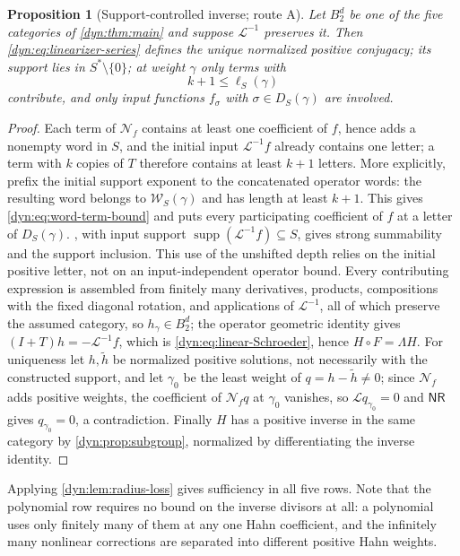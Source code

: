\documentclass[11pt,letterpaper]{article}
\newtheorem{proposition}[proposition]{Proposition}
\theoremstyle{definition}
\theoremstyle{remark}
\newcommand{\supp}{\operatorname{supp}}
\newcommand{\word}{\mathcal W}
\newcommand{\Li}{\mathcal L}
\newcommand{\NN}{\mathcal N}
\newcommand{\nres}{\mathsf{NR}}
\numberwithin{equation}{section}
\begin{document}
\begin{proposition}[Support-controlled inverse; route A]
\label{dyn:prop:linearization}
Let $B_2^{d}$ be one of the five categories of \cref{dyn:thm:main} and
suppose $\Li^{-1}$ preserves it. Then \eqref{dyn:eq:linearizer-series}
defines the unique normalized positive conjugacy; its support lies in
$S^{*}\setminus\{0\}$; at weight $\gamma$ only terms with
\begin{equation}\label{dyn:eq:word-term-bound}
 k+1\le\ell_S(\gamma)
\end{equation}
contribute, and only input functions $f_\sigma$ with $\sigma\in D_S(\gamma)$
are involved.
\end{proposition}
\begin{proof}
Each term of $\NN_f$ contains at least one coefficient of $f$, hence adds a
nonempty word in $S$, and the initial input $\Li^{-1}f$ already contains one
letter; a term with $k$ copies of $T$ therefore contains at least $k+1$
letters. More explicitly, prefix the initial support exponent to the
concatenated operator words: the resulting word belongs to
$\word_S(\gamma)$ and has length at least $k+1$. This gives
\eqref{dyn:eq:word-term-bound} and puts every participating coefficient of
$f$ at a letter of $D_S(\gamma)$. , with input
support $\supp(\Li^{-1}f)\subseteq S$, gives strong summability and the
support inclusion. This use of the unshifted depth relies on the initial
positive letter, not on an input-independent operator bound. Every
contributing expression is assembled from finitely many derivatives,
products, compositions with the fixed diagonal rotation, and applications
of $\Li^{-1}$, all of which preserve the assumed category, so $h_\gamma\in
B_2^{d}$; the operator geometric identity gives $(I+T)h=-\Li^{-1}f$, which
is \eqref{dyn:eq:linear-Schroeder}, hence $H\circ F=\Lambda H$. For
uniqueness let $h,\widetilde h$ be normalized positive solutions, not
necessarily with the constructed support, and let $\gamma_0$ be the least
weight of $q=h-\widetilde h\ne0$; since $\NN_f$ adds positive weights, the
coefficient of $\NN_fq$ at $\gamma_0$ vanishes, so $\Li q_{\gamma_0}=0$ and
$\nres$ gives $q_{\gamma_0}=0$, a contradiction. Finally $H$ has a positive
inverse in the same category by \cref{dyn:prop:subgroup}, normalized by
differentiating the inverse identity.
\end{proof}

Applying \cref{dyn:lem:radius-loss} gives sufficiency in all five rows.
Note that the polynomial row requires no bound on the inverse divisors at
all: a polynomial uses only finitely many of them at any one Hahn
coefficient, and the infinitely many nonlinear corrections are separated
into different positive Hahn weights.
\end{document}
